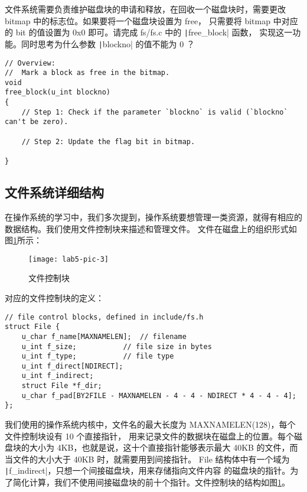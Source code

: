 \begin{exercise}
文件系统需要负责维护磁盘块的申请和释放，在回收一个磁盘块时，需要更改 bitmap 中的标志位。如果要将一个磁盘块设置为 free，
只需要将 bitmap 中对应的 bit 的值设置为 0x0 即可。请完成 fs/fs.c 中的 \texttt|free_block| 函数，
实现这一功能。同时思考为什么参数 \texttt|blockno| 的值不能为 0 ？

\begin{verbatim}
// Overview:
//  Mark a block as free in the bitmap.
void
free_block(u_int blockno)
{
    // Step 1: Check if the parameter `blockno` is valid (`blockno` can't be zero). 

    // Step 2: Update the flag bit in bitmap.

}
\end{verbatim}

\end{exercise}

\subsection{文件系统详细结构}

在操作系统的学习中，我们多次提到，操作系统要想管理一类资源，就得有相应的数据结构。我们使用文件控制块来描述和管理文件。
文件在磁盘上的组织形式如图\ref{lab5-pic-3}所示：

\begin{figure}[htbp]
  \centering
  \texttt{[image: lab5-pic-3]}
  \caption{文件控制块}\label{lab5-pic-3}
\end{figure}

对应的文件控制块的定义：

\begin{verbatim}
// file control blocks, defined in include/fs.h
struct File {
    u_char f_name[MAXNAMELEN];  // filename
    u_int f_size;           // file size in bytes
    u_int f_type;           // file type
    u_int f_direct[NDIRECT];
    u_int f_indirect;
    struct File *f_dir;
    u_char f_pad[BY2FILE - MAXNAMELEN - 4 - 4 - NDIRECT * 4 - 4 - 4];
};
\end{verbatim}

我们使用的操作系统内核中，文件名的最大长度为 MAXNAMELEN(128)，每个文件控制块设有 10 个直接指针，
用来记录文件的数据块在磁盘上的位置。每个磁盘块的大小为 4KB，也就是说，这十个直接指针能够表示最大 40KB
的文件，而当文件的大小大于 40KB 时，就需要用到间接指针。
File 结构体中有一个域为 \texttt|f_indirect|，只想一个间接磁盘块，用来存储指向文件内容
的磁盘块的指针。为了简化计算，我们不使用间接磁盘块的前十个指针。文件控制块的结构如图\ref{lab5-pic-3}。

